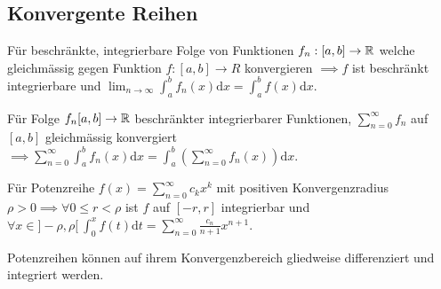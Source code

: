 \subsection{Konvergente Reihen}
\begin{compactitem}
    \item Für beschränkte, integrierbare Folge von Funktionen $f_n: [a,b] \to \mathbb{R}$ welche gleichmässig gegen Funktion $f:[a,b] \to R$ konvergieren $\implies f$ ist beschränkt integrierbare und $\lim_{n \to \infty} \int_{a}^{b} f_n(x) \mathrm{d}x = \int_{a}^{b} f(x) \mathrm{d}x$.
    \item Für Folge $f_n [a,b] \to \mathbb{R}$ beschränkter integrierbarer Funktionen, $\sum_{n=0}^{\infty} f_n$ auf $[a,b]$ gleichmässig konvergiert $\implies \sum_{n=0}^{\infty} \int_{a}^{b} f_n(x) \mathrm{d}x = \int_{a}^{b} \left( \sum_{n=0}^{\infty} f_n(x) \right) \mathrm{d}x$.
    \item Für Potenzreihe $f(x) = \sum_{n=0}^{\infty} c_kx^k$ mit positiven Konvergenzradius $\rho > 0 \implies \forall 0 \le r < \rho$ ist $f$ auf $[-r, r]$ integrierbar und $\forall x \in ]-\rho, \rho[ \ \int_{0}^{x} f(t) \mathrm{d}t = \sum_{n=0}^{\infty} \frac{c_n}{n + 1} x^{n+1}$.
        \begin{compactitem}
            \item Potenzreihen können auf ihrem Konvergenzbereich gliedweise differenziert und integriert werden.
        \end{compactitem}
\end{compactitem}


